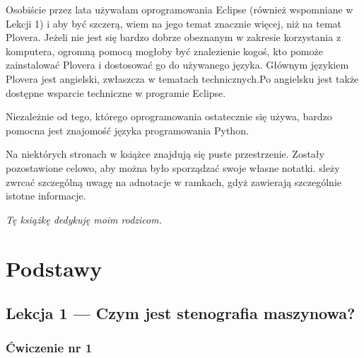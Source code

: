 \documentclass[12p, oneside]{book}
\begin{document}
Osobiście przez lata używałam oprogramowania Eclipse (również wspomniane w Lekcji 1) i aby być szczerą, wiem na jego temat znacznie więcej, niż na temat Plovera. Jeżeli nie jest się bardzo dobrze obeznanym w zakresie korzystania z komputera, ogromną pomocą mogłoby być znalezienie kogoś, kto pomoże zainstalować Plovera i dostosować go do używanego języka. Głównym językiem Plovera jest angielski, zwłaszcza w tematach technicznych.Po angielsku jest także dostępne wsparcie techniczne w programie Eclipse.

Niezależnie od tego, którego oprogramowania ostatecznie się używa, bardzo pomocna jest znajomość języka programowania Python.

Na niektórych stronach w książce znajdują się puste przestrzenie. Zostały pozostawione celowo, aby można było sporządzać swoje własne notatki. sleży zwrcać szczególną uwagę na adnotacje w ramkach, gdyż zawierają szczególnie istotne informacje.

\clearpage
\begin{center}
\thispagestyle{empty}
\vspace*{\fill}
{\em Tę książkę dedykuję moim rodzicom.}
\vspace*{\fill}
\end{center}
\clearpage

\mainmatter

\chapter{Podstawy}

\pagebreak
\section{Lekcja 1 --- Czym jest stenografia maszynowa?}
\subsection{Ćwiczenie nr 1}
\end{document}

